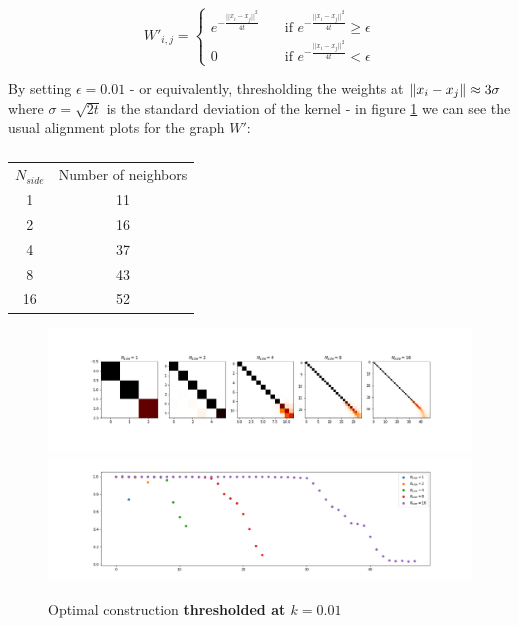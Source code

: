 $$W'_{i,j} = \begin{cases}
e^{-\frac{||x_i-x_j||^2}{4t}}\quad& \text{if } e^{-\frac{||x_i-x_j||^2}{4t}} \geq \epsilon\\
0 \quad & \text{if } e^{-\frac{||x_i-x_j||^2}{4t}} < \epsilon
\end{cases}$$

By setting $\epsilon = 0.01$ - or equivalently, thresholding the weights at $\left\lVert x_i-x_j\right\rVert\approx 3\sigma$ where $\sigma=\sqrt{2t}$ is the standard deviation of the kernel - in figure \ref{fig:optimal_thresholded} we can see the usual alignment plots for the graph $W'$:

\begin{table}[h]
	\centering
	\begin{tabular}{ c|c} 
		$N_{side}$ & Number of neighbors \\ 
		1 & 11 \\ 
		2 & 16 \\ 
		4 & 37 \\ 
		8 & 43 \\ 
		16 & 52 \\ 
	\end{tabular}
\caption{\label{table:NN}}
\end{table}

\begin{figure}[h]
	\centering
	\includegraphics[width=\textwidth]{../codes/02.HeatKernelGraphLaplacian/HEALPix/06_figures/optimal_thresholded.png}	
	\includegraphics[width=\textwidth]{../codes/02.HeatKernelGraphLaplacian/HEALPix/06_figures/optimal_thresholded_diagonal.png}
	\caption{\label{fig:optimal_thresholded}Optimal construction \textbf{thresholded at $k=0.01$}}
\end{figure}

